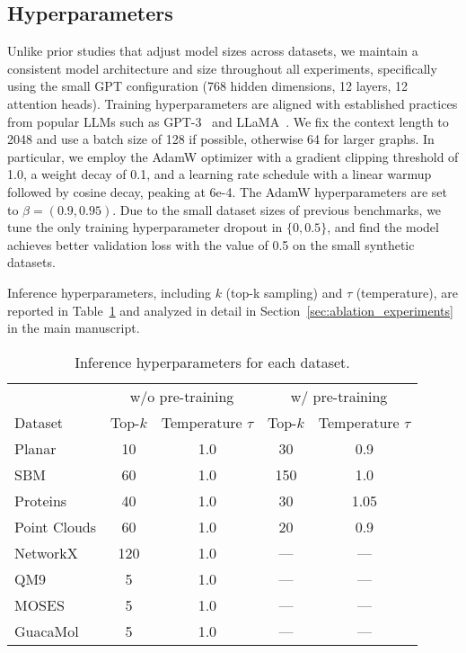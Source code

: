 \subsection{Hyperparameters}
Unlike prior studies that adjust model sizes across datasets, we maintain a consistent model architecture and size throughout all experiments, specifically using the small GPT configuration (768 hidden dimensions, 12 layers, 12 attention heads). Training hyperparameters are aligned with established practices from popular LLMs such as GPT-3~\citep{gpt3} and LLaMA~\citep{touvron2023llama}. We fix the context length to 2048 and use a batch size of 128 if possible, otherwise 64 for larger graphs. In particular, we employ the AdamW optimizer with a gradient clipping threshold of 1.0, a weight decay of 0.1, and a learning rate schedule with a linear warmup followed by cosine decay, peaking at 6e-4. The AdamW hyperparameters are set to $\beta=(0.9, 0.95)$. Due to the small dataset sizes of previous benchmarks, we tune the only training hyperparameter dropout in $\{0, 0.5\}$, and find the model achieves better validation loss with the value of 0.5 on the small synthetic datasets.

Inference hyperparameters, including $k$ (top-k sampling) and $\tau$ (temperature), are reported in Table~\ref{app:tab:inference_hyperparameters} and analyzed in detail in Section~\ref{sec:ablation_experiments} in the main manuscript.

\begin{table}[tbp]
    \centering
    \caption{Inference hyperparameters for each dataset.}
    \label{app:tab:inference_hyperparameters}
    \begin{sc}
    \begin{tabular}{lcccc}\toprule
        & \multicolumn{2}{c}{w/o pre-training} & \multicolumn{2}{c}{w/ pre-training} \\ \cmidrule{2-5}
        Dataset & Top-$k$ & Temperature $\tau$ & Top-$k$ & Temperature $\tau$ \\  \midrule
        Planar & 10 & 1.0 & 30 & 0.9 \\
        SBM & 60 & 1.0 & 150 & 1.0 \\
        Proteins & 40 & 1.0 & 30 & 1.05 \\
        Point Clouds & 60 & 1.0 & 20 & 0.9 \\ 
        NetworkX & 120 & 1.0 & --- & --- \\ \midrule
        QM9 & 5 & 1.0 & --- & ---\\
        MOSES & 5 & 1.0 & --- & --- \\
        GuacaMol & 5 & 1.0 & --- & --- \\ \bottomrule
    \end{tabular}
    \end{sc}
\end{table}

